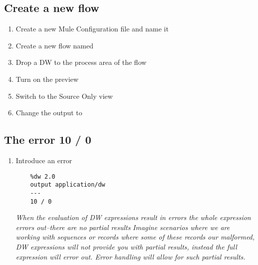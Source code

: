 \subsection{Create a new flow}
\begin{enumerate}
\item Create a new Mule Configuration file and name it 
\item Create a new flow named 
\item Drop a DW to the process area of the flow
\item Turn on the preview
\item Switch to the Source Only view
\item Change the output to 
\end{enumerate}

\subsection{The error 10 / 0}
\begin{enumerate}[resume*]
\item Introduce an error
  \begin{lstlisting}
    %dw 2.0
    output application/dw
    ---
    10 / 0
  \end{lstlisting}
  \emph{
    When the evaluation of DW expressions result in errors the whole expression errors out--there are no partial results
  }
  \newline
  \emph{
    Imagine scenarios where we are working with sequences or records where some of these records our malformed, DW expressions will not provide you with partial results, instead the full expression will error out.  Error handling will allow for such partial results.
  }
\end{enumerate}

